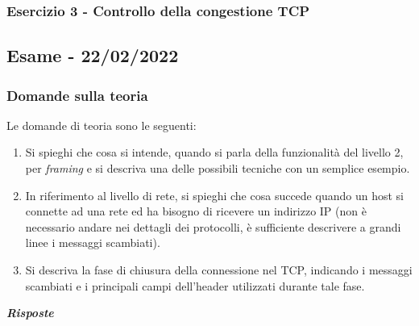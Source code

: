 \documentclass[a4paper]{article}
\begin{document}
	\subsubsection{Esercizio 3 - Controllo della congestione TCP}
	
	\newpage

	\subsection[\textbf{Esame - 22/02/2022}]{Esame - 22/02/2022}
	
	\subsubsection{Domande sulla teoria}
	Le domande di teoria sono le seguenti:
	\begin{enumerate}
		\item Si spieghi che cosa si intende, quando si parla della funzionalità del livello 2, per \emph{framing} e si descriva una delle possibili tecniche con un semplice esempio.
		
		\item In riferimento al livello di rete, si spieghi che cosa succede quando un host si connette ad una rete ed ha bisogno di ricevere un indirizzo IP (non è necessario andare nei dettagli dei protocolli, è sufficiente descrivere a grandi linee i messaggi scambiati).
		
		\item Si descriva la fase di chiusura della connessione nel TCP, indicando i messaggi scambiati e i principali campi dell'header utilizzati durante tale fase.
	\end{enumerate}
	\textcolor{Green4}{\textbf{\emph{Risposte}}}
\end{document}
